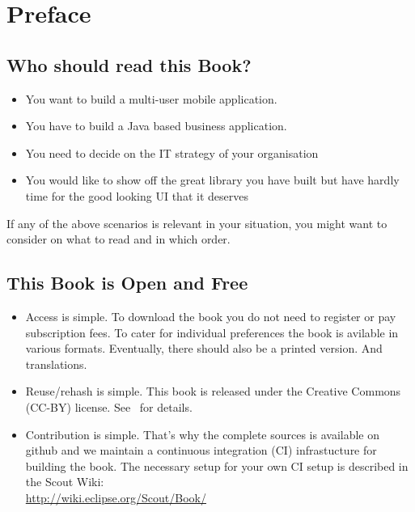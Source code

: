 \documentclass[a4paper,10pt,twoside]{book}
\begin{document}
  \sloppy
\fi


\chapter{Preface}


\section*{Who should read this Book?}

\begin{itemize}
\item You want to build a multi-user mobile application.
\item You have to build a Java based business application. 
\item You need to decide on the IT strategy of your organisation
\item You would like to show off the great library you have built but have hardly time for the good looking UI that it deserves
\end{itemize}

\noindent If any of the above scenarios is relevant in your situation, you might want to consider  on what to read and in which order.

\section*{This Book is Open and Free}

\begin{itemize}
\item Access is simple. 
To download the book you do not need to register or pay subscription fees. 
To cater for individual preferences the book is avilable in various formats. 
Eventually, there should also be a printed version. And translations.

\item Reuse/rehash is simple. 
This book is released under the Creative Commons (CC-BY) license. 
See~ for details.

\item Contribution is simple. 
That's why the complete sources is available on github and we maintain a continuous integration (CI) infrastucture for building the book. 
The necessary setup for your own CI setup is described in the Scout Wiki: \\
\url{http://wiki.eclipse.org/Scout/Book/}
\end{itemize}
\end{document}

